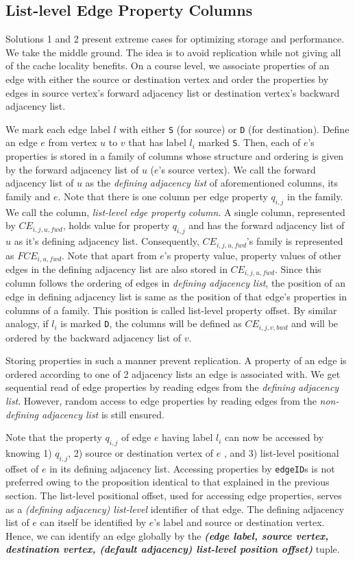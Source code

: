 \subsection{List-level Edge Property Columns}

Solutions 1 and 2 present extreme cases for optimizing storage and performance. We take the middle ground. The idea is to avoid replication while not giving all of the cache locality benefits. On a course level, we associate properties of an edge with either the source or destination vertex and order the properties by edges in source vertex's forward adjacency list or destination vertex's backward adjacency list.

We mark each edge label $l$ with either \texttt{S} (for source) or \texttt{D} (for destination). Define an edge $e$ from vertex $u$ to $v$  that has label $l_i$ marked \texttt{S}. Then, each of $e$'s properties is stored in a family of columns whose structure and ordering is given by the forward adjacency list of $u$ ($e$'s source vertex). We call the forward adjacency list of $u$ as the \emph{defining adjacency list} of aforementioned columns, its family and $e$. Note that there is one column per edge property $q_{i,j}$ in the family. We call the column, \emph{list-level edge property column}. A single column, represented by $CE_{i,j,u,fwd}$, holds value for property $q_{i,j}$ and has the forward adjacency list of $u$ as it's defining adjacency list. Consequently, $CE_{i,j,u,fwd}$'s family is represented as $FCE_{i,u,fwd}$. Note that apart from $e$'s property value, property values of other edges in the defining adjacency list are also stored in $CE_{i,j,u,fwd}$. Since this column follows the ordering of edges in \emph{defining adjacency list}, the position of an edge in defining adjacency list is same as the position of that edge's properties in columns of a family. This position is called list-level property offset. By similar analogy, if $l_i$ is marked \texttt{D}, the columns will be defined as $CE_{i,j,v,bwd}$ and will be ordered by the backward adjacency list of $v$.

Storing properties in such a manner prevent replication. A property of an edge is ordered according to one of 2 adjacency lists an edge is associated with. We get sequential read of edge properties by reading edges from the \emph{defining adjacency list}. However, random access to edge properties by reading edges from the \emph{non-defining adjacency list} is still ensured.

Note that the property $q_{i,j}$ of edge $e$ having label $l_i$ can now be accessed by knowing 1) $q_{i,j}$, 2) source or destination vertex of $e$ , and 3) list-level positional offset of $e$ in its defining adjacency list. Accessing properties by \texttt{edgeID}s is not preferred owing to the proposition identical to that explained in the previous section. The list-level positional offset, used for accessing edge properties, serves as a \emph{(defining adjacency) list-level} identifier of that edge. The defining adjacency list of $e$ can itself be identified by $e$'s label and source or destination vertex. Hence, we can identify an edge globally by the \emph{\textbf{(edge label, source vertex, destination vertex, (default adjacency) list-level position offset)}} tuple. 

